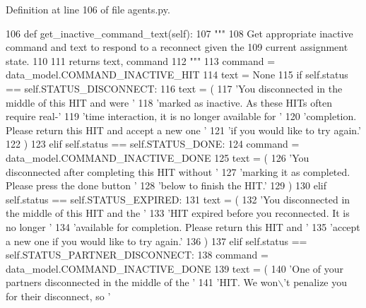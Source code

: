 Definition at line 106 of file agents.\+py.


\begin{DoxyCode}
106     \textcolor{keyword}{def }get\_inactive\_command\_text(self):
107         \textcolor{stringliteral}{"""}
108 \textcolor{stringliteral}{        Get appropriate inactive command and text to respond to a reconnect given the}
109 \textcolor{stringliteral}{        current assignment state.}
110 \textcolor{stringliteral}{}
111 \textcolor{stringliteral}{        returns text, command}
112 \textcolor{stringliteral}{        """}
113         command = data\_model.COMMAND\_INACTIVE\_HIT
114         text = \textcolor{keywordtype}{None}
115         \textcolor{keywordflow}{if} self.status == self.STATUS\_DISCONNECT:
116             text = (
117                 \textcolor{stringliteral}{'You disconnected in the middle of this HIT and were '}
118                 \textcolor{stringliteral}{'marked as inactive. As these HITs often require real-'}
119                 \textcolor{stringliteral}{'time interaction, it is no longer available for '}
120                 \textcolor{stringliteral}{'completion. Please return this HIT and accept a new one '}
121                 \textcolor{stringliteral}{'if you would like to try again.'}
122             )
123         \textcolor{keywordflow}{elif} self.status == self.STATUS\_DONE:
124             command = data\_model.COMMAND\_INACTIVE\_DONE
125             text = (
126                 \textcolor{stringliteral}{'You disconnected after completing this HIT without '}
127                 \textcolor{stringliteral}{'marking it as completed. Please press the done button '}
128                 \textcolor{stringliteral}{'below to finish the HIT.'}
129             )
130         \textcolor{keywordflow}{elif} self.status == self.STATUS\_EXPIRED:
131             text = (
132                 \textcolor{stringliteral}{'You disconnected in the middle of this HIT and the '}
133                 \textcolor{stringliteral}{'HIT expired before you reconnected. It is no longer '}
134                 \textcolor{stringliteral}{'available for completion. Please return this HIT and '}
135                 \textcolor{stringliteral}{'accept a new one if you would like to try again.'}
136             )
137         \textcolor{keywordflow}{elif} self.status == self.STATUS\_PARTNER\_DISCONNECT:
138             command = data\_model.COMMAND\_INACTIVE\_DONE
139             text = (
140                 \textcolor{stringliteral}{'One of your partners disconnected in the middle of the '}
141                 \textcolor{stringliteral}{'HIT. We won\(\backslash\)'t penalize you for their disconnect, so '}

\end{DoxyCode}
